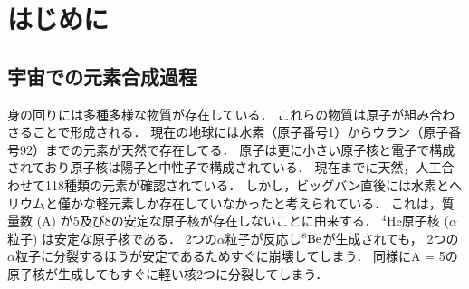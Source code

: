 \documentclass[../master]{subfiles}
\begin{document}
\chapter{はじめに}
\section{宇宙での元素合成過程}
\label{seq::nucleaosynthesis}
身の回りには多種多様な物質が存在している．
これらの物質は原子が組み合わさることで形成される．
現在の地球には水素（原子番号1）からウラン（原子番号92）までの元素が天然で存在してる．
原子は更に小さい原子核と電子で構成されており原子核は陽子と中性子で構成されている．
現在までに天然，人工合わせて118種類の元素が確認されている．
しかし，ビッグバン直後には水素とヘリウムと僅かな軽元素しか存在していなかったと考えられている．
これは，質量数 (A) が5及び8の安定な原子核が存在しないことに由来する．
${}^{4}\mathrm{He}$原子核 ($\alpha$粒子) は安定な原子核である．
2つの$\alpha$粒子が反応し${}^{8}{\rm Be}$が生成されても，
2つの$\alpha$粒子に分裂するほうが安定であるためすぐに崩壊してしまう．
同様にA = 5の原子核が生成してもすぐに軽い核2つに分裂してしまう．
\end{document}
